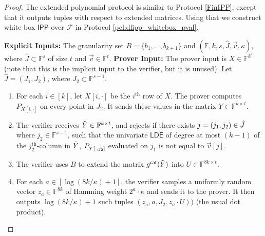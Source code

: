 \documentclass[11pt]{article}
\makeatletter
\newcommand{\IPP}{\mathsf{IPP}}
\newcommand{\LDE}{\mathsf{LDE}}
\newcommand{\F}{\mathbb{F}}
\newcommand{\sF}{\mathcal{F}}
\newenvironment{protocol}[1][htb]{
    \renewcommand{\ALG@name}{Protocol}
    \begin{algorithm}[#1]
    }{\end{algorithm}
}
\makeatother
\begin{document}
\begin{proof}
The extended polynomial protocol is similar to Protocol \ref{FinIPP}, except that it outputs tuples with respect to extended matrices. Using that we construct white-box $\IPP$ over $\sF$ in Protocol \ref{pcl:dfipp_whitebox_pval}. 
\begin{protocol}
\caption{Extended Polynomial Folding Protocol}
\label{pcl:epf_protocol}
\begin{algorithmic}{}
 \vspace{0.1in}
\STATE \textbf{Explicit Inputs:} The granularity set $B = \{b_1, \dots, b_{k+1}\}$ and $(\F, k, s, \hat{J}, \Vec{v},\kappa)$, where $\hat{J} \subset \F^s$ of size $t$ and $\vec{v} \in \F^t$.
\vspace{0.1in}
\STATE \textbf{Prover Input:} The prover input is $X \in \F^{k^{s}}$ (note that this is the implicit input to the verifier, but it is unused).
\vspace{0.1in}
\STATE Let $\hat{J} = (J_1, J_2)$, where $J_2 \subset \F^{s-1}$.
\begin{enumerate}
    \item For each $i \in [k]$, let $X[i,\cdot]$ be the $i^{\text{th}}$ row of $X$. The prover computes $P_{X[i,\cdot]}$ on every point in $J_2$. It sends these values in the matrix $Y \in \F^{k \times t}$.         
    \item The verifier receives $\Tilde{Y} \in \F^{k \times t}$, and rejects if there exists $j = (j_1,j_2) \in \Hat{J}$ where $j_2 \in \F^{s-1}$, such that the univariate $\LDE$ of degree at most $(k-1)$ of the $j_2^{\text{th}}$-column in $\Tilde{Y}$, $P_{\Tilde{Y}[\cdot, j_2]}$ evaluated on $j_1$ is not equal to $\Vec{v}[j]$.
            
    \item The verifier uses $B$ to extend the matrix $g^{\mathsf{cat}}(\Tilde{Y})$ into $U \in \F^{8k \times t}$.
            
    \item For each $a \in [\log (8k/\kappa)+1]$, the verifier samples a uniformly random vector $z_a \in \F^{8k}$ of Hamming weight $2^a\cdot\kappa$ and sends it to the prover. It then outputs $\log (8k/\kappa)+1$ such tuples $(z_a, a, J_2, z_a \cdot U))$ (the usual dot product).
    \end{enumerate}
\end{algorithmic}
\end{protocol}


\end{proof}
\end{document}
